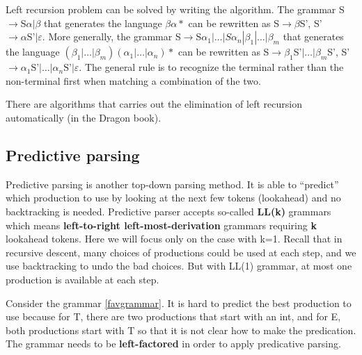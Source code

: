 Left recursion problem can be solved by writing the algorithm. The grammar S$\rightarrow$S$\alpha|\beta$ that generates the language $\beta\alpha*$ can be rewritten as S$\rightarrow\beta$S', S'$\rightarrow\alpha\text{S'}|\varepsilon$. More generally, the grammar S$\rightarrow$S$\alpha_1|\dots|S\alpha_n|\beta_1|\dots|\beta_m$ that generates the language 
$(\beta_1|\dots|\beta_m)(\alpha_1|\dots|\alpha_n)*$ can be rewritten as S$\rightarrow\beta_1$S'$|\dots|\beta_m$S', S'$\rightarrow\alpha_1\text{S'}|\dots|\alpha_n\text{S'}|\varepsilon$. The general rule is to recognize the terminal rather than the non-terminal first when matching a combination of the two. 

There are algorithms that carries out the elimination of left recursion automatically (in the Dragon book).
\subsection{Predictive parsing}
Predictive parsing is another top-down parsing method. It is able to ``predict'' which production to use by looking at the next few tokens (lookahead) and no backtracking is needed. Predictive parser accepts so-called {\bf LL(k)} grammars which means {\bf left-to-right left-most-derivation} grammars requiring {\bf k} lookahead tokens. Here we will focus only on the case with k=1. Recall that in recursive descent, many choices of productions could be used at each step, and we use backtracking to undo the bad choices. But with LL(1) grammar, at most one production is available at each step. 

Consider the grammar \eqref{favgrammar}.  It is hard to predict the best production to use because for T, there are two productions that start with an {\sf int}, and for E, both productions start with T so that it is not clear how to make the predication. The grammar needs to be {\bf left-factored} in order to apply predicative parsing.

